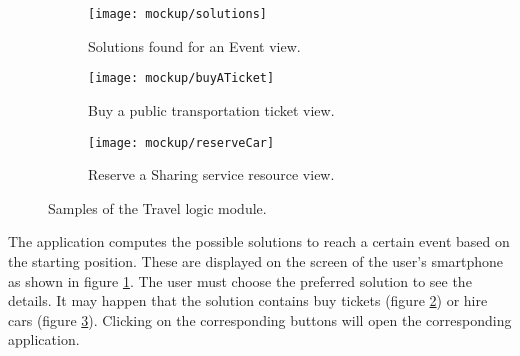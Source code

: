 \begin{figure}[H]	
	\begin{subfigure}{0.5\linewidth}
		\centering		
		\texttt{[image: mockup/solutions]} 
		\caption{Solutions found for an Event view.}
		\label{fig:solutions}
	\end{subfigure}
	\begin{subfigure}{0.5\linewidth}
		\texttt{[image: mockup/buyATicket]} 
		\centering
		\caption{Buy a public transportation ticket view.}
		\label{fig:buyTicket}
	\end{subfigure} 
	\hfill
	
	\bigskip	
	\begin{subfigure}{\linewidth}
			\centering
		\texttt{[image: mockup/reserveCar]} 
		\caption{Reserve a Sharing service resource view.}
		\label{fig:reserveCar}
	\end{subfigure}

	\caption{Samples of the Travel logic module.}
	\label{fig:travelLogic}
\end{figure}

The application computes the possible solutions to reach a certain event based on the starting position. These are displayed on the screen of the user's smartphone as shown in figure \ref{fig:solutions}. The user must choose the preferred solution to see the details. It may happen that the solution contains buy tickets (figure \ref{fig:buyTicket}) or hire cars (figure \ref{fig:reserveCar}). Clicking on the corresponding buttons will open the corresponding application.